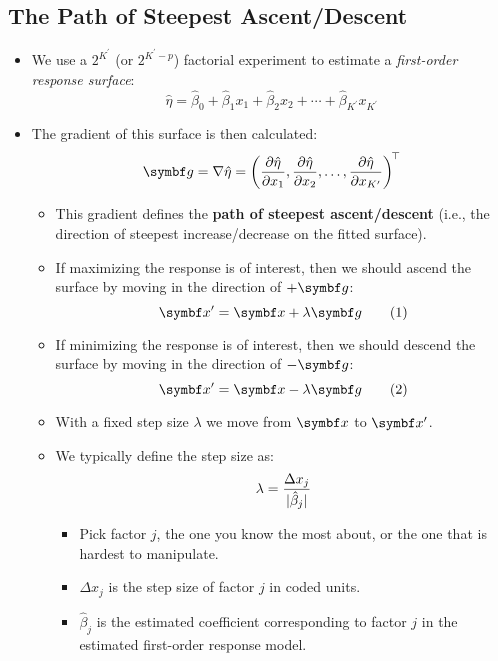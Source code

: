 \subsection{The Path of Steepest Ascent/Descent}
\begin{itemize}
      \item We use a $ 2^{K^\prime} $ (or $ 2^{K^\prime-p} $) factorial experiment to estimate a \emph{first-order response surface}:
            \[ \hat{\eta}=\hat{\beta}_0+\hat{\beta}_1x_1+\hat{\beta}_2x_2+\cdots+\hat{\beta}_{K^\prime}x_{K^\prime} \]
      \item The gradient of this surface is then calculated:
            \[ \Vector{g}=\nabla \hat{\eta}=\biggl(\pdv{\hat{\eta}}{x_1},\pdv{\hat{\eta}}{x_2},\ldots,\pdv{\hat{\eta}}{x_{K^\prime}}\biggr)^{\!\top} \]
            \begin{itemize}
                  \item This gradient defines the \textbf{path of steepest ascent/descent} (i.e., the direction of steepest increase/decrease on the fitted surface).
                  \item If maximizing the response is of interest, then we should ascend the surface by moving in the
                        direction of $ +\Vector{g} $:
                        \begin{equation}
                              \Vector{x}^\prime=\Vector{x}+\lambda \Vector{g}\label{eq:maxgr}\tag*{(1)}
                        \end{equation}
                  \item If minimizing the response is of interest, then we should descend the surface by moving in the
                        direction of $ -\Vector{g} $:
                        \begin{equation}
                              \Vector{x}^\prime=\Vector{x}-\lambda \Vector{g}\label{eq:mingr}\tag*{(2)}
                        \end{equation}
                  \item With a fixed step size $ \lambda $ we move from $ \Vector{x} $ to $ \Vector{x}^\prime $.
                  \item We typically define the step size as:
                        \[ \lambda=\frac{\Delta x_j}{\lvert\hat{\beta}_j\rvert}  \]
                        \begin{itemize}
                              \item Pick factor $ j $, the one you know the most about, or the one that is hardest to manipulate.
                              \item $ \Delta x_j $ is the step size of factor $ j $ in coded units.
                              \item $ \hat{\beta}_j $ is the estimated coefficient corresponding to factor $ j $ in the estimated first-order response model.
                        \end{itemize}
            \end{itemize}
\end{itemize}
